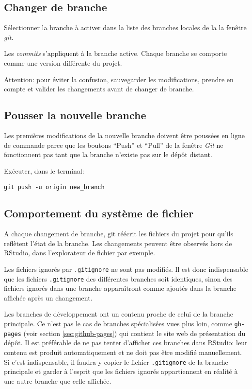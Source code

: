 \documentclass[
  12pt,
  french,
  a4paper,
  extrafontsizes,onecolumn,openright
  ]{memoir}
\begin{document}
\hypertarget{changer-de-branche}{%
\subsection{Changer de branche}\label{changer-de-branche}}

Sélectionner la branche à activer dans la liste des branches locales de la la fenêtre \emph{git}.

Les \emph{commits} s'appliquent à la branche active.
Chaque branche se comporte comme une version différente du projet.

Attention: pour éviter la confusion, sauvegarder les modifications, prendre en compte et valider les changements avant de changer de branche.

\hypertarget{pousser-la-nouvelle-branche}{%
\subsection{Pousser la nouvelle branche}\label{pousser-la-nouvelle-branche}}

Les premières modifications de la nouvelle branche doivent être poussées en ligne de commande parce que les boutons \enquote{Push} et \enquote{Pull} de la fenêtre \emph{Git} ne fonctionnent pas tant que la branche n'existe pas sur le dépôt distant.

Exécuter, dans le terminal:

\begin{verbatim}
git push -u origin new_branch
\end{verbatim}

\hypertarget{comportement-du-systuxe8me-de-fichier}{%
\subsection{Comportement du système de fichier}\label{comportement-du-systuxe8me-de-fichier}}

A chaque changement de branche, git réécrit les fichiers du projet pour qu'ils reflètent l'état de la branche.
Les changements peuvent être observés hors de RStudio, dans l'explorateur de fichier par exemple.

Les fichiers ignorés par \texttt{.gitignore} ne sont pas modifiés.
Il est donc indispensable que les fichiers \texttt{.gitignore} des différentes branches soit identiques, sinon des fichiers ignorés dans une branche apparaîtront comme ajoutés dans la branche affichée après un changement.

Les branches de développement ont un contenu proche de celui de la branche principale.
Ce n'est pas le cas de branches spécialisées vues plus loin, comme \texttt{gh-pages} (voir section \ref{sec:github-pages}) qui contient le site web de présentation du dépôt.
Il est préférable de ne pas tenter d'afficher ces branches dans RStudio: leur contenu est produit automatiquement et ne doit pas être modifié manuellement.
Si c'est indispensable, il faudra y copier le fichier \texttt{.gitignore} de la branche principale et garder à l'esprit que les fichiers ignorés appartiennent en réalité à une autre branche que celle affichée.
\end{document}
